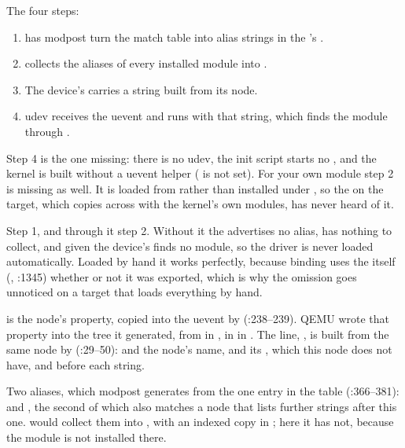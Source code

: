  The four steps:
\begin{enumerate}
  \item {} has modpost turn the match table into alias strings in the
    's .
  \item {} collects the aliases of every installed module into .
  \item The device's  carries a  string built from its node.
  \item udev receives the uevent and runs  with that string, which finds the module
    through .
\end{enumerate}
Step 4 is the one missing: there is no udev, the init script starts no , and the kernel
is built without a uevent helper ( is not set). For your own module step
2 is missing as well. It is loaded from  rather than installed under ,
so the  on the target, which  copies across with the kernel's
own modules, has never heard of it.

 Step 1, and through it step 2. Without it the  advertises no alias,
 has nothing to collect, and  given the device's  finds no
module, so the driver is never loaded automatically. Loaded by hand it works perfectly, because
binding uses the  itself (,
:1345) whether or not it was exported, which is why the omission goes
unnoticed on a target that loads everything by hand.

  is the node's  property,
copied into the uevent by  (:238--239). QEMU wrote
that property into the tree it generated, from  in , in
 in . The  line,
, is built from the same node by 
(:29--50):  and the node's name,  and its
, which this node does not have, and  before each 
string.

 Two aliases, which modpost generates from the one entry in the table
(:366--381):  and
, the second of which also matches a node that lists further
 strings after this one.  would collect them into
, with an indexed copy in ; here it
has not, because the module is not installed there.

